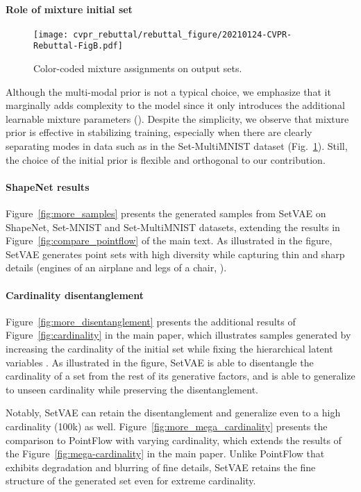 \documentclass[final]{arxiv/cvpr}
\begin{document}
\paragraph{Role of mixture initial set}
\begin{figure}[!t]
    \centering
    \texttt{[image: cvpr\_rebuttal/rebuttal\_figure/20210124-CVPR-Rebuttal-FigB.pdf]}
    \caption{Color-coded mixture assignments on output sets.}
\label{fig:mog_attention}
\end{figure}
Although the multi-modal prior is not a typical choice, we emphasize that it marginally adds complexity to the model since it only introduces the additional learnable mixture parameters ().
Despite the simplicity, we observe that mixture prior is effective in stabilizing training, especially when there are clearly separating modes in data such as in the Set-MultiMNIST dataset (Fig.~\ref{fig:mog_attention}).
Still, the choice of the initial prior is flexible and orthogonal to our contribution.

\paragraph{ShapeNet results}
Figure~\ref{fig:more_samples} presents the generated samples from SetVAE on ShapeNet, Set-MNIST and Set-MultiMNIST datasets, extending the results in Figure~\ref{fig:compare_pointflow} of the main text.
As illustrated in the figure, SetVAE generates point sets with high diversity while capturing thin and sharp details (\eg engines of an airplane and legs of a chair, \etc).
\paragraph{Cardinality disentanglement}
Figure~\ref{fig:more_disentanglement} presents the additional results of Figure~\ref{fig:cardinality} in the main paper, which illustrates samples generated by increasing the cardinality of the initial set  while fixing the hierarchical latent variables .
As illustrated in the figure, SetVAE is able to disentangle the cardinality of a set from the rest of its generative factors, and is able to generalize to unseen cardinality while preserving the disentanglement.

Notably, SetVAE can retain the disentanglement and generalize even to a high cardinality (100k) as well.
Figure~\ref{fig:more_mega_cardinality} presents the comparison to PointFlow with varying cardinality, which extends the results of the Figure~\ref{fig:mega-cardinality} in the main paper.
Unlike PointFlow that exhibits degradation and blurring of fine details, SetVAE retains the fine structure of the generated set even for extreme cardinality.
\end{document}
